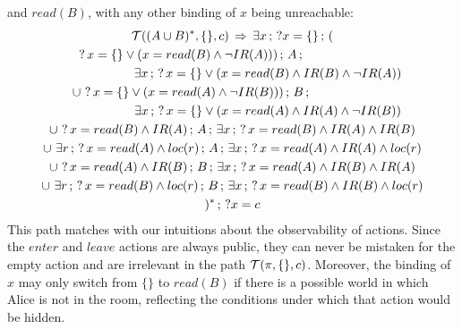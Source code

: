 and $read(B)$, with any other binding of $x$ being unreachable:\begin{multline*}
\mathcal{T}((A\cup B)^{*},\{\},c)\,\Rightarrow\,\exists x\,;\,?x=\{\}\,;\,(\\
?\, x=\{\}\vee(x=read(B)\wedge\neg IR(A)))\,;\, A\,;\,\,\,\,\,\,\,\,\,\,\,\,\,\,\,\,\,\,\,\,\,\,\,\,\,\,\,\,\,\,\,\,\,\,\,\,\,\,\,\,\\
\,\,\,\,\,\,\,\,\,\,\,\,\,\,\,\,\,\,\,\,\,\,\,\,\,\,\,\,\,\,\,\,\,\,\exists x\,;\,?\, x=\{\}\vee(x=read(B)\wedge IR(B)\wedge\neg IR(A))\\
\cup\,\,?\, x=\{\}\vee(x=read(A)\wedge\neg IR(B)))\,;\, B\,;\,\,\,\,\,\,\,\,\,\,\,\,\,\,\,\,\,\,\,\,\,\,\,\,\,\,\,\,\,\,\,\,\,\,\,\,\,\,\,\,\\
\,\,\,\,\,\,\,\,\,\,\,\,\,\,\,\,\,\,\,\,\,\,\,\,\,\,\,\,\,\,\,\,\,\,\exists x\,;\,?\, x=\{\}\vee(x=read(A)\wedge IR(A)\wedge\neg IR(B))\\
\cup\,\,?\, x=read(B)\wedge IR(A)\,;\, A\,;\,\exists x\,;\,?\, x=read(B)\wedge IR(A)\wedge IR(B)\\
\cup\,\,\exists r\,;\,?\, x=read(A)\wedge loc(r)\,;\, A\,;\,\exists x\,;\,?\, x=read(A)\wedge IR(A)\wedge loc(r)\\
\cup\,\,?\, x=read(A)\wedge IR(B)\,;\, B\,;\,\exists x\,;\,?\, x=read(A)\wedge IR(B)\wedge IR(A)\\
\cup\,\,\exists r\,;\,?\, x=read(B)\wedge loc(r)\,;\, B\,;\,\exists x\,;\,?\, x=read(B)\wedge IR(B)\wedge loc(r)\\
)^{*}\,;\,?x=c\end{multline*}
 This path matches with our intuitions about the observability of
actions. Since the $enter$ and $leave$ actions are always public,
they can never be mistaken for the empty action and are irrelevant
in the path $\mathcal{T}(\pi,\{\},c)$. Moreover, the binding of $x$ may
only switch from $\{\}$ to $read(B)$ if there is a possible world
in which Alice is not in the room, reflecting the conditions under
which that action would be hidden.

